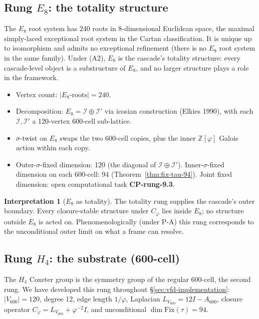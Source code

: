 \documentclass[11pt]{article}
\theoremstyle{plain}
\theoremstyle{definition}
\newtheorem{interpretation}[theorem]{Interpretation}
\theoremstyle{remark}
\newcommand{\Zphi}{\mathbb{Z}[\varphi]}
\newcommand{\Ical}{\mathcal{I}}
\newcommand{\Fix}{\mathrm{Fix}}
\newcommand{\Cph}{C_\varphi}
\begin{document}
\subsection{Rung $E_8$: the totality structure}

The $E_8$ root system has 240 roots in 8-dimensional Euclidean space, the maximal simply-laced exceptional root system in the Cartan classification. It is unique up to isomorphism and admits no exceptional refinement (there is no $E_9$ root system in the same family). Under (A2), $E_8$ is the cascade's totality structure: every cascade-level object is a substructure of $E_8$, and no larger structure plays a role in the framework.

\begin{itemize}[leftmargin=2em]
\item Vertex count: $|E_8\text{-roots}| = 240$.
\item Decomposition: $E_8 = \Ical \oplus \Ical'$ via icosian construction (Elkies 1990), with each $\Ical, \Ical'$ a 120-vertex 600-cell sub-lattice.
\item $\sigma$-twist on $E_8$ swaps the two 600-cell copies, plus the inner $\Zphi$ Galois action within each copy.
\item Outer-$\sigma$-fixed dimension: 120 (the diagonal of $\Ical \oplus \Ical'$). Inner-$\sigma$-fixed dimension on each 600-cell: 94 (Theorem~\ref{thm:fix-tau-94}). Joint fixed dimension: open computational task \textbf{CP-rung-9.3}.
\end{itemize}

\begin{interpretation}[$E_8$ as totality]\label{int:rung-e8}
The totality rung supplies the cascade's outer boundary. Every closure-stable structure under $\Cph$ lies inside $E_8$; no structure outside $E_8$ is acted on. Phenomenologically (under P-A) this rung corresponds to the unconditional outer limit on what a frame can resolve.
\end{interpretation}

\subsection{Rung $H_4$: the substrate (600-cell)}

The $H_4$ Coxeter group is the symmetry group of the regular 600-cell, the second rung. We have developed this rung throughout \S\ref{sec:vfd-implementation}: $|V_{600}| = 120$, degree 12, edge length $1/\varphi$, Laplacian $L_{V_{600}} = 12 I - A_{600}$, closure operator $\Cph = L_{V_{600}} + \varphi^{-2} I$, and unconditional $\dim \Fix(\tau) = 94$.
\end{document}
